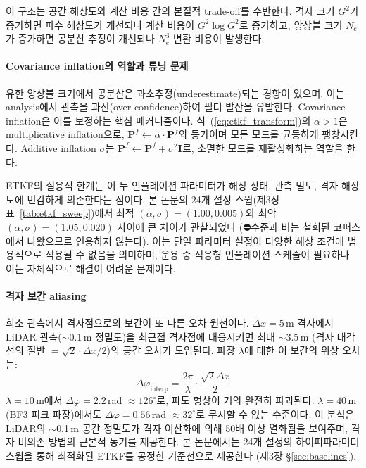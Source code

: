 \documentclass[11pt]{report}
\numberwithin{equation}{chapter}
\numberwithin{figure}{chapter}
\numberwithin{table}{chapter}
\begin{document}
이 구조는 공간 해상도와 계산 비용 간의 본질적 trade-off를 수반한다.
격자 크기 $G^2$가 증가하면 파수 해상도가 개선되나 계산 비용이 $G^2 \log G^2$로
증가하고, 앙상블 크기 $N_e$가 증가하면 공분산 추정이 개선되나
$N_e^3$ 변환 비용이 발생한다.

\paragraph{Covariance inflation의 역할과 튜닝 문제}
유한 앙상블 크기에서 공분산은 과소추정(underestimate)되는 경향이 있으며,
이는 analysis에서 관측을 과신(over-confidence)하여 필터 발산을 유발한다.
Covariance inflation은 이를 보정하는 핵심 메커니즘이다.
식~(\ref{eq:etkf_transform})의 $\alpha > 1$은 multiplicative inflation으로,
$\mathbf{P}^f \leftarrow \alpha \cdot \mathbf{P}^f$와 등가이며
모든 모드를 균등하게 팽창시킨다.
Additive inflation $\sigma$는 $\mathbf{P}^f \leftarrow \mathbf{P}^f + \sigma^2 \mathbf{I}$로,
소멸한 모드를 재활성화하는 역할을 한다.

ETKF의 실용적 한계는 이 두 인플레이션 파라미터가 해상 상태, 관측 밀도,
격자 해상도에 민감하게 의존한다는 점이다.
본 논문의 24개 설정 스윕(제3장 표~\ref{tab:etkf_sweep})에서
최적 $(\alpha, \sigma) = (1.00, 0.005)$와
최악 $(\alpha, \sigma) = (1.05, 0.020)$ 사이에 큰 차이가 관찰되었다
(⛔수준과 비는 철회된 코퍼스에서 나왔으므로 인용하지 않는다). 이는 단일 파라미터 설정이 다양한 해상 조건에 범용적으로
적용될 수 없음을 의미하며, 운용 중 적응형 인플레이션 스케줄이 필요하나
이는 자체적으로 해결이 어려운 문제이다.

\paragraph{격자 보간 aliasing}
희소 관측에서 격자점으로의 보간이 또 다른 오차 원천이다.
$\Delta x = 5$\,m 격자에서 LiDAR 관측($\sim$0.1\,m 정밀도)을
최근접 격자점에 대응시키면 최대 $\sim$3.5\,m (격자 대각선의 절반
$= \sqrt{2} \cdot \Delta x / 2$)의 공간 오차가 도입된다.
파장 $\lambda$에 대한 이 보간의 위상 오차는:
\begin{equation}
  \Delta\varphi_{\text{interp}} = \frac{2\pi}{\lambda} \cdot \frac{\sqrt{2}\Delta x}{2}
\end{equation}
$\lambda = 10$\,m에서 $\Delta\varphi = 2.2$\,rad $\approx 126^\circ$로,
파도 형상이 거의 완전히 파괴된다.
$\lambda = 40$\,m (BF3 피크 파장)에서도 $\Delta\varphi = 0.56$\,rad $\approx 32^\circ$로
무시할 수 없는 수준이다.
이 분석은 LiDAR의 $\sim$0.1\,m 공간 정밀도가
격자 이산화에 의해 50배 이상 열화됨을 보여주며,
격자 비의존 방법의 근본적 동기를 제공한다.
본 논문에서는 24개 설정의 하이퍼파라미터 스윕을 통해 최적화된 ETKF를
공정한 기준선으로 제공한다 (제3장 \S\ref{sec:baselines}).
\end{document}
